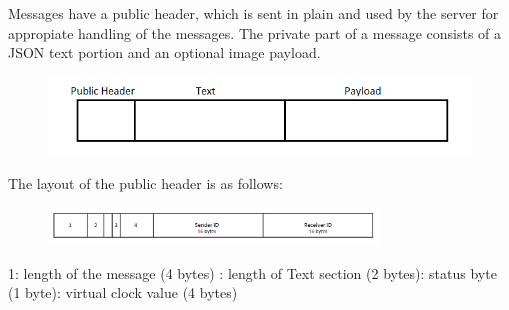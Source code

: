 \documentclass{report}
\newcommand{\lfig}[1]{\label{fig:#1}}
\begin{document}
Messages have a public header, which is sent in plain and used by the server for appropiate handling of the messages. The private part of a message consists of a JSON text portion and an optional image payload.

\begin{figure}[H]

	\centering
    \includegraphics[width=\columnwidth]{Layout.png}
    \lfig{Layout}
    \vspace{-5mm} %
\end{figure}


The layout of the public header is as follows:


\begin{figure}[H]

	\centering
    \includegraphics[height = 1cm]{PublicHeader.png}
    \lfig{PublicHeader}
    \vspace{-5mm} %
\end{figure}

1: length of the message (4 bytes) : length of Text section (2 bytes): status byte (1 byte): virtual clock value (4 bytes)\newline
\end{document}

